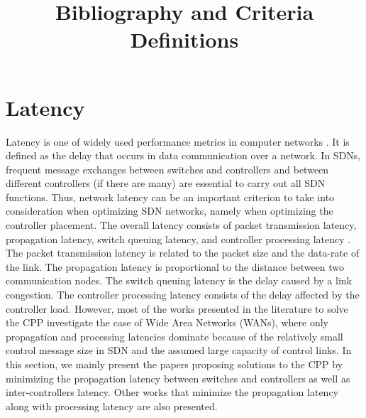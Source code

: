 \documentclass[a4paper,10pt]{article}
\title{Bibliography and Criteria Definitions}
\author{}
\begin{document}
\maketitle

\section{Latency}
Latency is one of widely used performance metrics in computer networks \cite{SiHa15}. It is defined as the delay that occurs in data communication over a network. In SDNs, frequent message exchanges between switches and controllers and between different controllers (if there are many) are essential to carry out all SDN functions. Thus, network latency can be an important criterion to take into consideration when optimizing SDN networks, namely when optimizing the controller placement. The overall latency consists of packet transmission latency, propagation latency, switch queuing latency, and controller processing latency \cite{WaZh17}. The packet transmission latency is related to the packet size and the data-rate of the link. The propagation latency is proportional to the distance between two communication nodes. The switch queuing latency is the delay caused by a link congestion. The controller processing latency consists of the delay affected by the controller load. However, most of the works presented in the literature to solve the CPP investigate the case of Wide Area Networks (WANs), where only propagation and processing latencies dominate because of the relatively small control message size in SDN and the assumed large capacity of control links. In this section, we mainly present the papers proposing solutions to the CPP by minimizing the propagation latency between switches and controllers as well as inter-controllers latency. Other works that minimize the propagation latency along with processing latency are also presented.


\end{document}
